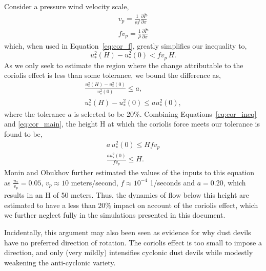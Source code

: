 Consider a pressure wind velocity scale, 
\begin{align}
 v_p = \frac{1}{\rho f} \frac{\partial \bar P}{\partial x}  \\
 f v_p = \frac{1}{\rho} \frac{\partial \bar P}{\partial x} 
\end{align}
which, when used in Equation~\ref{eq:cor_f}, greatly simplifies our
inequality to, 
\begin{equation}
u^2_*(H) - u^2_*(0)  < f v_p \, H. 
\label{eq:cor_main}
\end{equation}
As we only seek to estimate the region where the change attributable to
the coriolis effect is less than some tolerance, we bound
the difference as,
\begin{align}
 \frac{u^2_*(H) - u^2_*(0)}{u^2_*(0)} \leq a, \\
 u^2_*(H) - u^2_*(0)\leq a u^2_*(0),
\label{eq:cor_ineq}
\end{align}
where the tolerance $a$ is selected to be 20\%. Combining
Equations~\ref{eq:cor_ineq} and \ref{eq:cor_main}, the height H at which
the coriolis force meets our tolerance is found to be,
\begin{align}
 a \, u^2_*(0) \leq H f v_p \\
 \boxed{\frac{a u^2_*(0)}{f v_p} \leq H}.
\end{align}
Monin and Obukhov further estimated the values of the inputs to this
equation as $\frac{u_*}{v_p} = 0.05$, $v_p \approx 10$ meters/second, $f
\approx 10^{-4}$ 1/seconds and $a=0.20$, which results in an H of 50
meters. Thus, the dynamics of flow below this height are estimated to
have a less than 20\% impact on account of the coriolis effect, which we
further neglect fully in the simulations presented in this document. 

Incidentally, this argument may also been seen as evidence for why dust
devils have no preferred direction of rotation. The coriolis effect is
too small to impose a direction, and only (very mildly) intensifies
cyclonic dust devils while modestly weakening the anti-cyclonic variety.